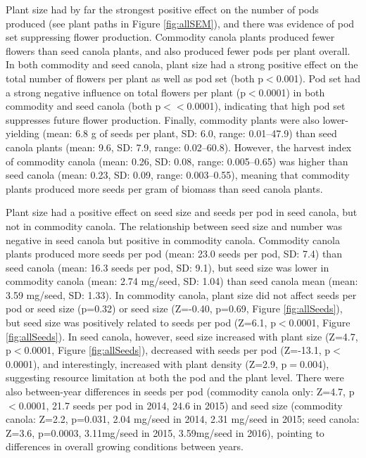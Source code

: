 \documentclass[12pt]{article} %
\begin{document}
Plant size had by far the strongest positive effect on the number of pods produced (see plant paths in Figure \ref{fig:allSEM}), and there was evidence of pod set suppressing flower production.
Commodity canola plants produced fewer flowers than seed canola plants, and also produced fewer pods per plant overall.
In both commodity and seed canola, plant size had a strong positive effect on the total number of flowers per plant as well as pod set (both p$<$0.001).
Pod set had a strong negative influence on total flowers per plant (p$<$0.0001) in both commodity and seed canola (both p$<<$0.0001), indicating that high pod set suppresses future flower production.
Finally, commodity plants were also lower-yielding (mean: 6.8 g of seeds per plant, SD: 6.0, range: 0.01--47.9) than seed canola plants (mean: 9.6, SD: 7.9, range: 0.02--60.8).
However, the harvest index of commodity canola (mean: 0.26, SD: 0.08, range: 0.005--0.65) was higher than seed canola (mean: 0.23, SD: 0.09, range: 0.003--0.55), meaning that commodity plants produced more seeds per gram of biomass than seed canola plants.%

Plant size had a positive effect on seed size and seeds per pod in seed canola, but not in commodity canola. 
The relationship between seed size and number was negative in seed canola but positive in commodity canola.
Commodity canola plants produced more seeds per pod (mean: 23.0 seeds per pod, SD: 7.4) than seed canola (mean: 16.3 seeds per pod, SD: 9.1), 
but seed size was lower in commodity canola (mean: 2.74 mg/seed, SD: 1.04) than seed canola mean (mean: 3.59 mg/seed, SD: 1.33).
In commodity canola, plant size did not affect seeds per pod or seed size (p=0.32) or seed size (Z=-0.40, p=0.69, Figure \ref{fig:allSeeds}), but seed size was positively related to seeds per pod (Z=6.1, p$<$0.0001, Figure \ref{fig:allSeeds}).
In seed canola, however, seed size increased with plant size (Z=4.7, p$<$0.0001, Figure \ref{fig:allSeeds}), decreased with seeds per pod (Z=-13.1, p$<$0.0001), and interestingly, increased with plant density (Z=2.9, p$=$0.004), suggesting resource limitation at both the pod and the plant level. 
There were also between-year differences in seeds per pod (commodity canola only: Z=4.7, p$<$0.0001, 21.7 seeds per pod in 2014, 24.6 in 2015) and seed size (commodity canola: Z=2.2, p=0.031, 2.04 mg/seed in 2014, 2.31 mg/seed in 2015; seed canola: Z=3.6, p=0.0003, 3.11mg/seed in 2015, 3.59mg/seed in 2016), pointing to differences in overall growing conditions between years.
\end{document}

